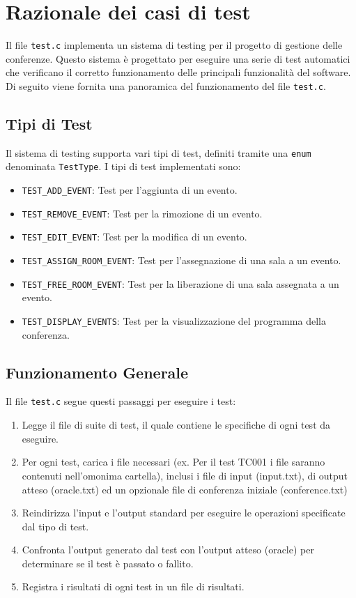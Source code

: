 \documentclass[11pt]{scrartcl} %
\begin{document}
\section{Razionale dei casi di test}
Il file \texttt{test.c} implementa un sistema di testing per il progetto di gestione delle conferenze. Questo sistema è progettato per eseguire una serie di test automatici che verificano il corretto funzionamento delle principali funzionalità del software. Di seguito viene fornita una panoramica del funzionamento del file \texttt{test.c}.

\subsection{Tipi di Test}
Il sistema di testing supporta vari tipi di test, definiti tramite una \texttt{enum} denominata \texttt{TestType}. I tipi di test implementati sono:
\begin{itemize}
    \item \texttt{TEST\_ADD\_EVENT}: Test per l'aggiunta di un evento.
    \item \texttt{TEST\_REMOVE\_EVENT}: Test per la rimozione di un evento.
    \item \texttt{TEST\_EDIT\_EVENT}: Test per la modifica di un evento.
    \item \texttt{TEST\_ASSIGN\_ROOM\_EVENT}: Test per l'assegnazione di una sala a un evento.
    \item \texttt{TEST\_FREE\_ROOM\_EVENT}: Test per la liberazione di una sala assegnata a un evento.
    \item \texttt{TEST\_DISPLAY\_EVENTS}: Test per la visualizzazione del programma della conferenza.
\end{itemize}

\subsection{Funzionamento Generale}
Il file \texttt{test.c} segue questi passaggi per eseguire i test:
\begin{enumerate}
    \item Legge il file di suite di test, il quale contiene le specifiche di ogni test da eseguire.
    \item Per ogni test, carica i file necessari (ex. Per il test TC001 i file saranno contenuti nell'omonima cartella), inclusi i file di input (input.txt), di output atteso (oracle.txt) ed un opzionale file di conferenza iniziale (conference.txt)
    \item Reindirizza l'input e l'output standard per eseguire le operazioni specificate dal tipo di test.
    \item Confronta l'output generato dal test con l'output atteso (oracle) per determinare se il test è passato o fallito.
    \item Registra i risultati di ogni test in un file di risultati.
\end{enumerate}
\end{document}
